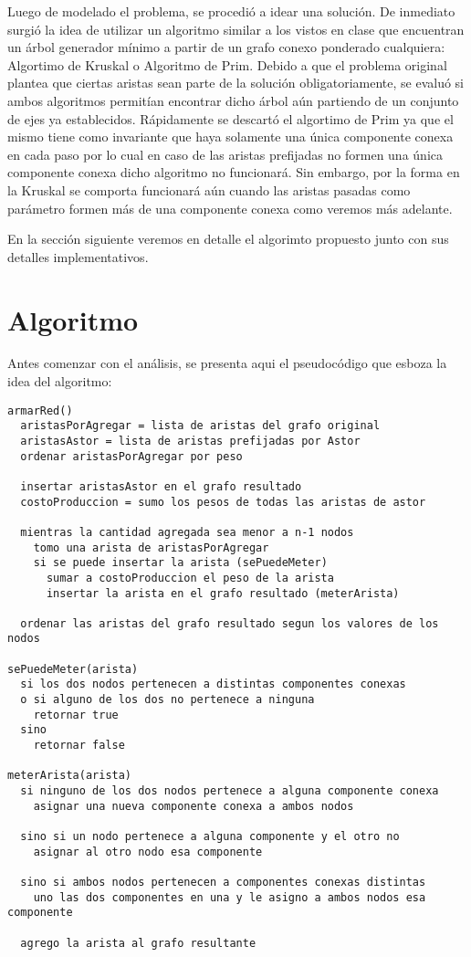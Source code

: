 \documentclass[a4paper,11pt] {article}
\begin{document}
Luego de modelado el problema, se procedió a idear una solución. De inmediato surgió la idea de utilizar un algoritmo similar a los vistos en clase que encuentran un árbol generador mínimo a partir de un grafo conexo ponderado cualquiera: Algortimo de Kruskal o Algoritmo de Prim. Debido a que el problema original plantea que ciertas aristas sean parte de la solución obligatoriamente, se evaluó si ambos algoritmos permitían encontrar dicho árbol aún partiendo de un conjunto de ejes ya establecidos. Rápidamente se descartó el algortimo de Prim ya que el mismo tiene como invariante que haya solamente una única componente conexa en cada paso por lo cual en caso de las aristas prefijadas no formen una única componente conexa dicho algoritmo no funcionará. Sin embargo, por la forma en la Kruskal se comporta funcionará aún cuando las aristas pasadas como parámetro formen más de una componente conexa como veremos más adelante.

En la sección siguiente veremos en detalle el algorimto propuesto junto con sus detalles implementativos.

\section*{Algoritmo}

Antes comenzar con el análisis, se presenta aqui el pseudocódigo que esboza la idea del algoritmo:

\begin{verbatim}
armarRed()
  aristasPorAgregar = lista de aristas del grafo original
  aristasAstor = lista de aristas prefijadas por Astor
  ordenar aristasPorAgregar por peso

  insertar aristasAstor en el grafo resultado
  costoProduccion = sumo los pesos de todas las aristas de astor

  mientras la cantidad agregada sea menor a n-1 nodos
    tomo una arista de aristasPorAgregar
    si se puede insertar la arista (sePuedeMeter)
      sumar a costoProduccion el peso de la arista
      insertar la arista en el grafo resultado (meterArista)

  ordenar las aristas del grafo resultado segun los valores de los nodos

sePuedeMeter(arista)
  si los dos nodos pertenecen a distintas componentes conexas
  o si alguno de los dos no pertenece a ninguna
    retornar true
  sino
    retornar false

meterArista(arista)
  si ninguno de los dos nodos pertenece a alguna componente conexa
    asignar una nueva componente conexa a ambos nodos

  sino si un nodo pertenece a alguna componente y el otro no
    asignar al otro nodo esa componente

  sino si ambos nodos pertenecen a componentes conexas distintas
    uno las dos componentes en una y le asigno a ambos nodos esa componente

  agrego la arista al grafo resultante
\end{verbatim}
\end{document}
